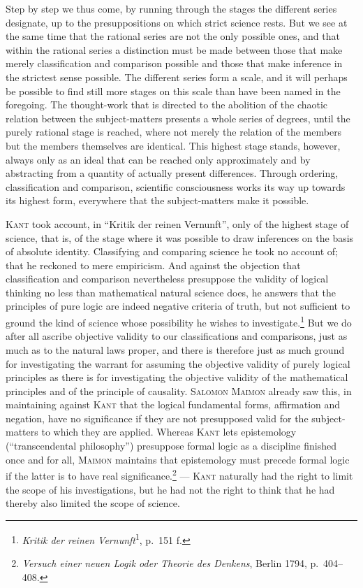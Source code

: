 \documentclass[12pt]{book}
\newcommand{\opage}[1]{\marginnote{\footnotesize\textit{[#1]}}}
\begin{document}
Step by step we thus come, by running through the stages the different series
designate, up to the presuppositions on which strict science rests. But we see
at the same time that the rational series are not the only possible ones, and
that within the rational series a distinction must be made between those that
make merely classification and comparison possible and those that make inference
in the strictest sense possible. The different series form a scale, and it will
perhaps be possible to find still more stages on \opage{11}this scale than have been named
in the foregoing. The thought-work that is directed to the abolition of the
chaotic relation between the subject-matters presents a whole series of degrees,
until the purely rational stage is reached, where not merely the relation of the
members but the members themselves are identical. This highest stage stands,
however, always only as an ideal that can be reached only approximately and by
abstracting from a quantity of actually present differences. Through ordering,
classification and comparison, scientific consciousness works its way up towards
its highest form, everywhere that the subject-matters make it possible.

\textsc{Kant} took account, in ``Kritik der reinen Vernunft'', only of the
highest stage of science, that is, of the stage where it was possible to draw
inferences on the basis of absolute identity. Classifying and comparing science
he took no account of; that he reckoned to mere empiricism. And against the
objection that classification and comparison nevertheless presuppose the
validity of logical thinking no less than mathematical natural science does, he
answers that the principles of pure logic are indeed negative criteria of truth,
but not sufficient to ground the kind of science whose possibility he wishes to
investigate.\footnote{\textit{Kritik der reinen
Vernunft}\textsuperscript{1}, p.\ 151 f.} But we do after all ascribe objective
validity to our classifications and comparisons, just as much as to the natural
laws proper, and there is therefore just as much ground for investigating the
warrant for assuming the objective validity of purely logical principles as
there is for investigating the objective validity of the mathematical principles
and of the principle of causality. \textsc{Salomon Maimon} already saw this, in
maintaining against \textsc{Kant} that the logical fundamental forms,
affirmation and negation, have no significance if they are not presupposed valid
for the subject-matters to which they are applied. Whereas \textsc{Kant} lets
epistemology (``transcendental philosophy'') presuppose formal logic as a
discipline finished once and for all, \textsc{Maimon} maintains that epistemology
must precede formal logic if the latter is to have real
significance.\footnote{\textit{Versuch einer neuen Logik oder Theorie des
Denkens}, Berlin 1794, p.\ 404--408.} --- \textsc{Kant} naturally had the right
to limit the scope of his investigations, but he had not the right to think that
he had thereby also limited the scope of science.
\end{document}
